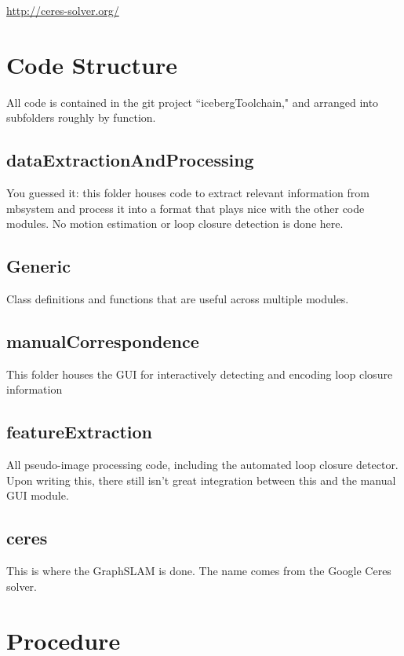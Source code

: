 \documentclass[12pt]{amsart}
\begin{document}
\url{http://ceres-solver.org/}

\section{Code Structure}

All code is contained in the git project ``icebergToolchain," and arranged into subfolders roughly by function.

\subsection{dataExtractionAndProcessing}

You guessed it: this folder houses code to extract relevant information from mbsystem and process it into a format that plays nice with the other code modules. No motion estimation or loop closure detection is done here.

\subsection{Generic}

Class definitions and functions that are useful across multiple modules.

\subsection{manualCorrespondence}

This folder houses the GUI for interactively detecting and encoding loop closure information 

\subsection{featureExtraction}

All pseudo-image processing code, including the automated loop closure detector. Upon writing this, there still isn't great integration between this and the manual GUI module.

\subsection{ceres}

This is where the GraphSLAM is done. The name comes from the Google Ceres solver.

\section{Procedure}
\end{document}
